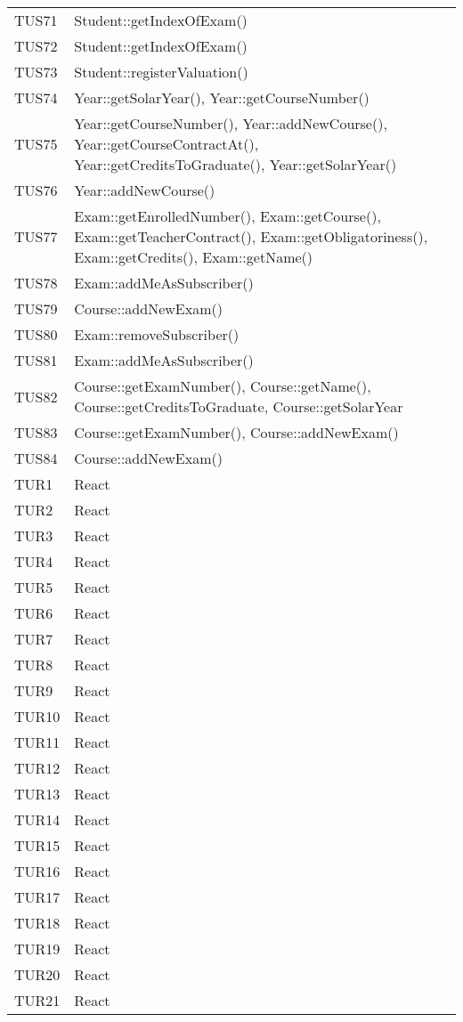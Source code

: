 \documentclass[PianoDiQualifica.tex]{subfiles}
\begin{document}
\begin{longtable}[H]{P{5cm}P{9cm}}
	TUS71 & Student::getIndexOfExam()\\
	TUS72 & Student::getIndexOfExam()\\
	TUS73 & Student::registerValuation()\\
	TUS74 & Year::getSolarYear(), Year::getCourseNumber()\\
	TUS75 & Year::getCourseNumber(), Year::addNewCourse(), Year::getCourseContractAt(), Year::getCreditsToGraduate(), Year::getSolarYear() \\
	TUS76 & Year::addNewCourse()\\
	TUS77 & Exam::getEnrolledNumber(), Exam::getCourse(), Exam::getTeacherContract(), Exam::getObligatoriness(), Exam::getCredits(), Exam::getName()\\
	TUS78 & Exam::addMeAsSubscriber()\\
	TUS79 & Course::addNewExam()\\
	TUS80 & Exam::removeSubscriber()\\
	TUS81 & Exam::addMeAsSubscriber()\\
	TUS82 & Course::getExamNumber(), Course::getName(), Course::getCreditsToGraduate, Course::getSolarYear\\
	TUS83 & Course::getExamNumber(), Course::addNewExam()\\
	TUS84 & Course::addNewExam()\\
	\hhline{==}
	TUR1 & React \\ 
	TUR2 & React \\ 
	TUR3 & React \\ 
	TUR4 & React \\ 
	TUR5 & React \\ 
	TUR6 & React \\ 
	TUR7 & React \\ 
	TUR8 & React \\ 
	TUR9 & React \\ 
	TUR10 & React \\ 
	TUR11 & React \\ 
	TUR12 & React \\ 
	TUR13 & React \\ 
	TUR14 & React \\ 
	TUR15 & React \\ 
	TUR16 & React \\ 
	TUR17 & React \\ 
	TUR18 & React \\ 
	TUR19 & React \\ 
	TUR20 & React \\ 
	TUR21 & React \\ 

\end{longtable}
\end{document}
